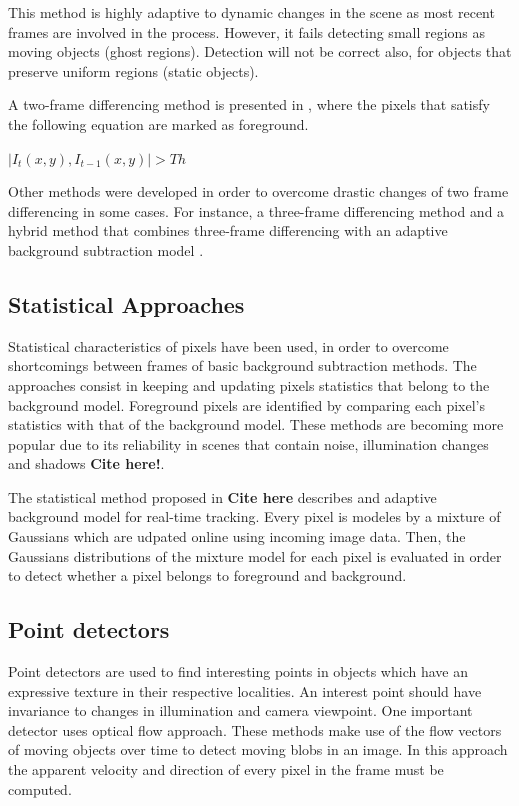 This method is highly adaptive to dynamic changes in the scene as most recent frames are involved in the process. However, it fails detecting small regions as moving objects (ghost regions). Detection will not be correct also, for objects that preserve uniform regions (static objects).

A two-frame differencing method is presented in \cite{Lipton1998a}, where the pixels that satisfy the following equation are marked as foreground.\\
\centerline{$|I_t(x,y), I_{t-1}(x,y)|>Th$}

Other methods were developed in order to overcome drastic changes of two frame differencing in some cases. For instance, a three-frame differencing method \cite{Wang2003} and a hybrid method that combines three-frame differencing with an adaptive background subtraction model \cite{Collins2000}.

\subsection{Statistical Approaches}

Statistical characteristics of pixels have been used, in order to overcome shortcomings between frames of basic background subtraction methods. The approaches consist in keeping and updating pixels statistics that belong to the background model. Foreground pixels are identified by comparing each pixel's statistics with that of the background model. These methods are becoming more popular due to its reliability in scenes that contain noise, illumination changes and shadows \textbf{Cite here!}.

The statistical method proposed in \textbf{Cite here} describes and adaptive background model for real-time tracking. Every pixel is modeles by a mixture of Gaussians which are udpated online using incoming image data. Then, the Gaussians distributions of the mixture model for each pixel is evaluated in order to detect whether a pixel belongs to foreground and background.

\subsection{Point detectors}

Point detectors are used to find interesting points in objects which have an expressive texture in their respective localities. An interest point should have invariance to changes in illumination and camera viewpoint. One important detector uses optical flow approach. These methods make use of the flow vectors of moving objects over time to detect moving blobs in an image. In this approach the apparent velocity and direction of every pixel in the frame must be computed.


